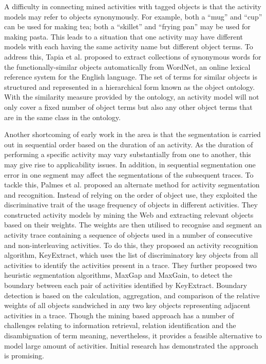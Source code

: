 A difficulty in connecting mined activities with tagged objects \cite{Perkowitz2004} \cite{Wyatt2005} is that the activity models may refer to objects synonymously. For example, both a “mug” and “cup” can be used for making tea; both a “skillet” and “frying pan” may be used for making pasta. This leads to a situation that one activity may have different models with each having the same activity name but different object terms. To address this, Tapia et al. \cite{Tapia2006} proposed to extract collections of synonymous words for the functionally-similar objects automatically from WordNet, an online lexical reference system for the English language. The set of terms for similar objects is structured and represented in a hierarchical form known as the object ontology. With the similarity measure provided by the ontology, an activity model will not only cover a fixed number of object terms but also any other object terms that are in the same class in the ontology. 

Another shortcoming of early work in the area \cite{Perkowitz2004} \cite{Wyatt2005} is that the segmentation is carried out in sequential order based on the duration of an activity. As the duration of performing a specific activity may vary substantially from one to another, this may give rise to applicability issues. In addition, in sequential segmentation one error in one segment may affect the segmentations of the subsequent traces. To tackle this, Palmes et al. \cite{Palmes2010} proposed an alternate method for activity segmentation and recognition. Instead of relying on the order of object use, they exploited the discriminative trait of the usage frequency of objects in different activities. They constructed activity models by mining the Web and extracting relevant objects based on their weights. The weights are then utilised to recognise and segment an activity trace containing a sequence of objects used in a number of consecutive and non-interleaving activities. To do this, they proposed an activity recognition algorithm, KeyExtract, which uses the list of discriminatory key objects from all activities to identify the activities present in a trace. They further proposed two heuristic segmentation algorithms, MaxGap and MaxGain, to detect the boundary between each pair of activities identified by KeyExtract. Boundary detection is based on the calculation, aggregation, and comparison of the relative weights of all objects sandwiched in any two key objects representing adjacent activities in a trace. Though the mining based approach has a number of challenges relating to information retrieval, relation identification and the disambiguation of term meaning, nevertheless, it provides a feasible alternative to model large amount of activities. Initial research has demonstrated the approach is promising. 

